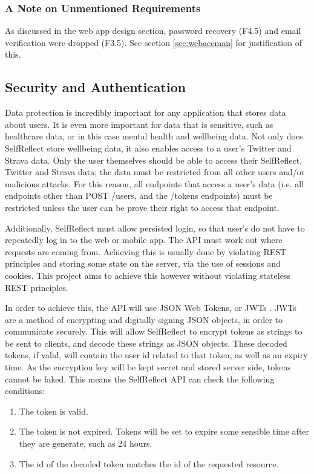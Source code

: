 \documentclass[11pt,openright,a4paper]{report}
\begin{document}
\subsubsection{A Note on Unmentioned Requirements}
As discussed in the web app design section, password recovery (F4.5) and email verification were dropped (F3.5). See section \ref{sec:webaccman} for justification of this.

\subsection{Security and Authentication} \label{sec:apisecurity}
Data protection is incredibly important for any application that stores data about users. It is even more important for data that is sensitive, such as healthcare data, or in this case mental health and wellbeing data. Not only does SelfReflect store wellbeing data, it also enables access to a user's Twitter and Strava data. Only the user themselves should be able to access their SelfReflect, Twitter and Strava data; the data must be restricted from all other users and/or malicious attacks. For this reason, all endpoints that access a user's data (i.e. all endpoints other than POST /users, and the /tokens endpoints) must be restricted unless the user can be prove their right to access that endpoint.

Additionally, SelfReflect must allow persisted login, so that user's do not have to repeatedly log in to the web or mobile app. The API must work out where requests are coming from. Achieving this is usually done by violating REST principles and storing some state on the server, via the use of sessions and cookies. This project aims to achieve this however without violating stateless REST principles.

In order to achieve this, the API will use JSON Web Tokens, or JWTs \parencite{jwtrfc}. JWTs are a method of encrypting and digitally signing JSON objects, in order to communicate securely. This will allow SelfReflect to encrypt tokens as strings to be sent to clients, and decode these strings as JSON objects. These decoded tokens, if valid, will contain the user id related to that token, as well as an expiry time. As the encryption key will be kept secret and stored server side, tokens cannot be faked. This means the SelfReflect API can check the following conditions:
\begin{enumerate}
\item The token is valid.
\item The token is not expired. Tokens will be set to expire some sensible time after they are generate, such as 24 hours.
\item The id of the decoded token matches the id of the requested resource.
\end{enumerate}
\end{document}
